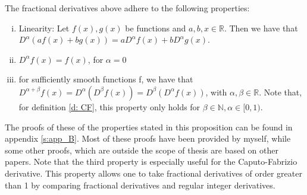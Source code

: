 \begin{proposition}\label{p: calculus}
    The fractional derivatives above adhere to the following properties:
    \begin{enumerate}[(i)]
        \item Linearity: Let \(f(x), g(x)\) be functions and \(a, b, x \in \mathbb{R}\). Then we have that \(D^{\alpha} (a f(x) + b g(x)) = a D^{\alpha} f(x) + b D^{\alpha} g(x)\).
        \item \(D^{\alpha} f(x) = f(x)\), for \(\alpha = 0\) 
        \item for sufficiently smooth functions f, we have that \(D^{\alpha + \beta} f(x) = D^\alpha(D^\beta f(x)) =  D^\beta(D^\alpha f(x))\), with \(\alpha, \beta \in \mathbb{R}\). Note that, for definition \ref{d: CF}, this property only holds for \(\beta \in \mathbb{N}, \alpha \in [0,1)\).
    \end{enumerate}
        
    
\end{proposition}

The proofs of these of the properties stated in this proposition can be found in appendix \ref{s:app_B}. Most of these proofs have been provided by myself, while some other proofs, which are outside the scope of thesis are based on other papers. Note that the third property is especially useful for the Caputo-Fabrizio derivative. This property allows one to take fractional derivatives of order greater than 1 by comparing fractional derivatives and regular integer derivatives.

